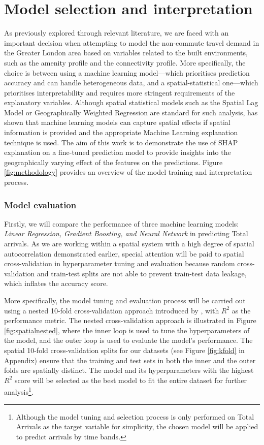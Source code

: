 \pagebreak[4] %
\section{Model selection and interpretation}

As previously explored through relevant literature, we are faced with an important decision when attempting to model the non-commute travel demand in the Greater London area based on variables related to the built environments, such as the amenity profile and the connectivity profile. More specifically, the choice is between using a machine learning model---which prioritises prediction accuracy and can handle heterogeneous data, and a spatial-statistical one---which prioritises interpretability and requires more stringent requirements of the explanatory variables. Although spatial statistical models such as the Spatial Lag Model or Geographically Weighted Regression are standard for such analysis, \citet{liExtractingSpatialEffects2022} has shown that machine learning models can capture spatial effects if spatial information is provided and the appropriate Machine Learning explanation technique is used. The aim of this work is to demonstrate the use of SHAP explanation on a fine-tuned prediction model to provide insights into the geographically varying effect of the features on the predictions. Figure \ref{fig:methodology} provides an overview of the model training and interpretation process.

\subsubsection*{Model evaluation}
Firstly, we will compare the performance of three machine learning models: \textit{Linear Regression, Gradient Boosting, and Neural Network} in predicting Total arrivals. As we are working within a spatial system with a high degree of spatial autocorrelation demonstrated earlier, special attention will be paid to spatial cross-validation in hyperparameter tuning and evaluation because random cross-validation and train-test splits are not able to prevent train-test data leakage, which inflates the accuracy score. 

More specifically, the model tuning and evaluation process will be carried out using a nested 10-fold cross-validation approach introduced by \citet{schratzPerformanceEvaluationHyperparameter2018}, with $R^2$ as the performance metric. The nested cross-validation approach is illustrated in Figure \ref{fig:spatialnested}, where the inner loop is used to tune the hyperparameters of the model, and the outer loop is used to evaluate the model's performance. The spatial 10-fold cross-validation splits for our datasets (see Figure \ref{fig:kfold} in Appendix) ensure that the training and test sets in both the inner and the outer folds are spatially distinct. The model and its hyperparameters with the highest $R^2$ score will be selected as the best model to fit the entire dataset for further analysis\footnote{Although the model tuning and selection process is only performed on Total Arrivals as the target variable for simplicity, the chosen model will be applied to predict arrivals by time bands.}.

